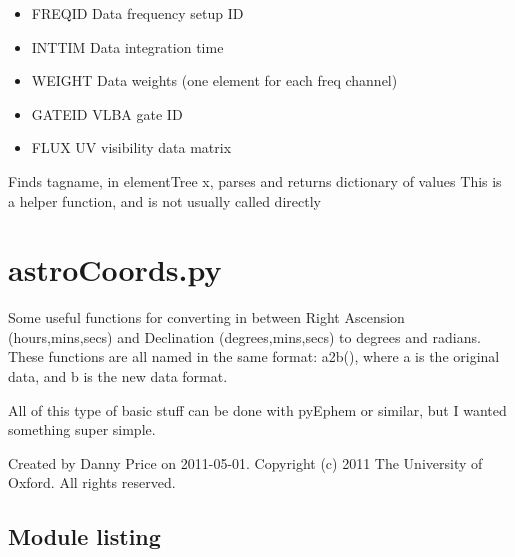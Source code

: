 \documentclass[letterpaper,10pt,english]{sphinxmanual}
\begin{document}
\begin{fulllineitems}
\begin{itemize}
\item {} 
FREQID       Data frequency setup ID

\item {} 
INTTIM       Data integration time

\item {} 
WEIGHT       Data weights (one element for each freq channel)

\item {} 
GATEID       VLBA gate ID

\item {} 
FLUX         UV visibility data matrix

\end{itemize}

\end{fulllineitems}



\begin{fulllineitems}
\label{index:pyFitsidi.parseConfig}
Finds tagname, in elementTree x, parses and returns dictionary of values
This is a helper function, and is not usually called directly

\end{fulllineitems}

\label{index:module-astroCoords}

\section{astroCoords.py}
\label{index:astrocoords-py}
Some useful functions for converting in between Right Ascension (hours,mins,secs)
and Declination (degrees,mins,secs) to degrees and radians. These functions are
all named in the same format: a2b(), where a is the original data, and b is the new
data format.

All of this type of basic stuff can be done with pyEphem or similar, but I wanted
something super simple.

Created by Danny Price on 2011-05-01.
Copyright (c) 2011 The University of Oxford. All rights reserved.


\subsection{Module listing}
\label{index:id1}
\end{document}
